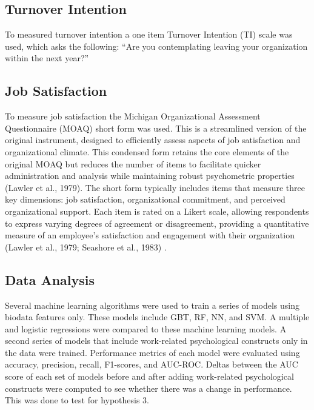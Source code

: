\documentclass[
  man]{apa7}
\begin{document}
\subsection{Turnover Intention}\label{turnover-intention-1}

To measured turnover intention a one item Turnover Intention (TI) scale was used, which asks the following: ``Are you contemplating leaving your organization within the next year?''

\subsection{Job Satisfaction}\label{job-satisfaction}

To measure job satisfaction the Michigan Organizational Assessment Questionnaire (MOAQ) short form was used. This is a streamlined version of the original instrument, designed to efficiently assess aspects of job satisfaction and organizational climate. This condensed form retains the core elements of the original MOAQ but reduces the number of items to facilitate quicker administration and analysis while maintaining robust psychometric properties (Lawler et al., 1979). The short form typically includes items that measure three key dimensions: job satisfaction, organizational commitment, and perceived organizational support. Each item is rated on a Likert scale, allowing respondents to express varying degrees of agreement or disagreement, providing a quantitative measure of an employee's satisfaction and engagement with their organization (Lawler et al., 1979; Seashore et al., 1983) .

\subsection{Data Analysis}\label{data-analysis-1}

Several machine learning algorithms were used to train a series of models using biodata features only. These models include GBT, RF, NN, and SVM. A multiple and logistic regressions were compared to these machine learning models. A second series of models that include work-related psychological constructs only in the data were trained. Performance metrics of each model were evaluated using accuracy, precision, recall, F1-scores, and AUC-ROC. Deltas between the AUC score of each set of models before and after adding work-related psychological constructs were computed to see whether there was a change in performance. This was done to test for hypothesis 3.
\end{document}
